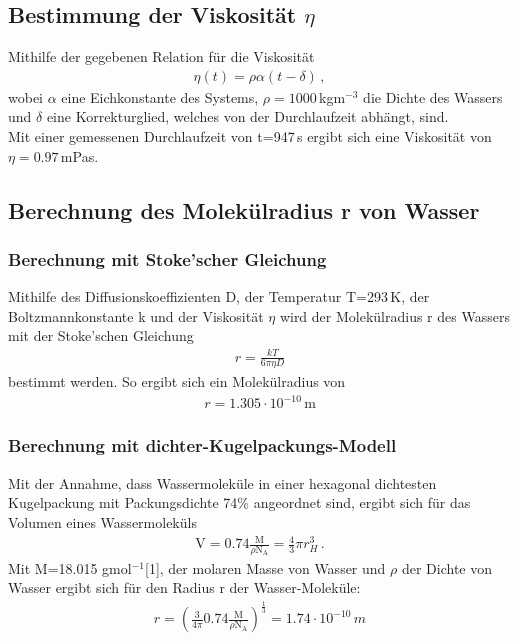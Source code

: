 \documentclass[]{scrartcl}
\begin{document}
\subsection{Bestimmung der Viskosität $\eta$}
Mithilfe der gegebenen Relation für die Viskosität
\begin{align*}
\eta(t)=\rho \alpha (t-\delta)\, ,
\end{align*}
wobei $\alpha$ eine Eichkonstante des Systems, $\rho=1000$\,kgm$^{-3}$ die Dichte des Wassers und $\delta$ eine Korrekturglied, welches von der Durchlaufzeit abhängt, sind. \\
Mit einer gemessenen Durchlaufzeit von t=947\,s ergibt sich eine Viskosität von $\eta=0.97$\,mPas.
\subsection{Berechnung des Molekülradius r von Wasser}
\subsubsection{Berechnung mit Stoke'scher Gleichung}
Mithilfe des Diffusionskoeffizienten D, der Temperatur T=293\,K, der Boltzmannkonstante k und der Viskosität $\eta$ wird der Molekülradius r des Wassers mit der Stoke'schen Gleichung
\begin{align*}
r=\frac{kT}{6\pi \eta D}
\end{align*}
bestimmt werden. So ergibt sich ein Molekülradius von
\begin{align*}
r = 1.305\cdot10^{-10}\,\text{m}
\end{align*}
\subsubsection{Berechnung mit dichter-Kugelpackungs-Modell}
Mit der Annahme, dass Wassermoleküle in einer hexagonal dichtesten Kugelpackung mit Packungsdichte 74\% angeordnet sind, ergibt sich für das Volumen eines Wassermoleküls
\begin{align*}
\text{V}=0.74 \frac{\text{M}}{\rho \text{N}_{\text{A}}}=\frac{4}{3}\pi r_H^3\,.
\end{align*}
Mit M=18.015 gmol$^{-1}$[1], der molaren Masse von Wasser und $\rho$ der Dichte von Wasser ergibt sich für den Radius r der Wasser-Moleküle:
\begin{align*}
r = \left( \frac{3}{4\pi}0.74\frac{\text{M}}{\rho \text{N}_{\text{A}}}\right)^{\frac{1}{3}}=1.74\cdot10^{-10}\,m
\end{align*}
\end{document}

